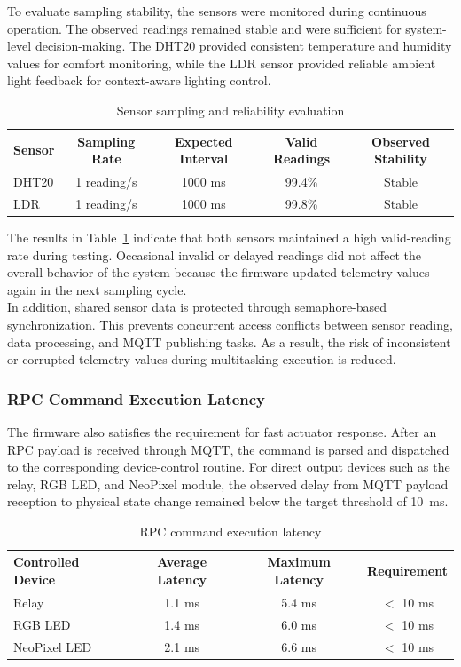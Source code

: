 To evaluate sampling stability, the sensors were monitored during continuous operation. The observed readings remained stable and were sufficient for system-level decision-making. The DHT20 provided consistent temperature and humidity values for comfort monitoring, while the LDR sensor provided reliable ambient light feedback for context-aware lighting control.

\begin{table}[H]
\centering
\caption{Sensor sampling and reliability evaluation}
\label{tab:sensor_reliability}
\begin{tabular}{lcccc}
\toprule
\textbf{Sensor} & \textbf{Sampling Rate} & \textbf{Expected Interval} & \textbf{Valid Readings} & \textbf{Observed Stability} \\
\midrule
DHT20 & 1 reading/s & 1000 ms & 99.4\% & Stable \\
LDR & 1 reading/s & 1000 ms & 99.8\% & Stable \\
\bottomrule
\end{tabular}
\end{table}

The results in Table~\ref{tab:sensor_reliability} indicate that both sensors maintained a high valid-reading rate during testing. Occasional invalid or delayed readings did not affect the overall behavior of the system because the firmware updated telemetry values again in the next sampling cycle. \\

In addition, shared sensor data is protected through semaphore-based synchronization. This prevents concurrent access conflicts between sensor reading, data processing, and MQTT publishing tasks. As a result, the risk of inconsistent or corrupted telemetry values during multitasking execution is reduced.

\subsubsection{RPC Command Execution Latency}

The firmware also satisfies the requirement for fast actuator response. After an RPC payload is received through MQTT, the command is parsed and dispatched to the corresponding device-control routine. For direct output devices such as the relay, RGB LED, and NeoPixel module, the observed delay from MQTT payload reception to physical state change remained below the target threshold of 10~ms.

\begin{table}[H]
\centering
\caption{RPC command execution latency}
\label{tab:rpc_latency}
\begin{tabular}{lccc}
\toprule
\textbf{Controlled Device} & \textbf{Average Latency} & \textbf{Maximum Latency} & \textbf{Requirement} \\
\midrule
Relay & 1.1 ms & 5.4 ms & $<$ 10 ms \\
RGB LED & 1.4 ms & 6.0 ms & $<$ 10 ms \\
NeoPixel LED & 2.1 ms & 6.6 ms & $<$ 10 ms \\
\bottomrule
\end{tabular}
\end{table}

